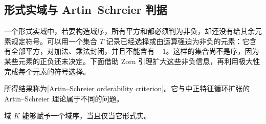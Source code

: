 \subsection{形式实域与 Artin–Schreier 判据}
\label{b1:subsec:E01:02}

一个形式实域中，若要构造域序，所有平方和都必须判为非负，却还没有给其余元素规定符号。可以用一个集合 \(T\) 记录已经选择或由运算强迫为非负的元素：它含有全部平方，对加法、乘法封闭，并且不能含有 \(-1\)。这样的集合尚不是序，因为某些元素的正负还未决定。下面借助 Zorn 引理扩大这些非负信息，再利用极大性完成每个元素的符号选择。

\ProseParagraphBreak
所得结果称为[Artin--Schreier orderability criterion]。它与中正特征循环扩张的 Artin--Schreier 理论属于不同的问题。

\begin{theorem}\label{b1:thm:artin-schreier-ordering}
	域 \(K\) 能够赋予一个域序，当且仅当它形式实。
\end{theorem}

